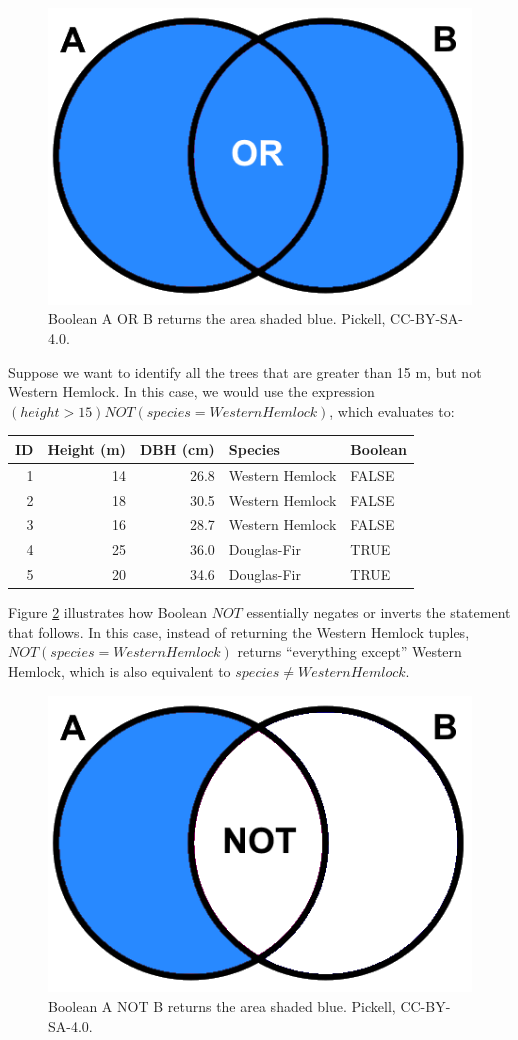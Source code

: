 \documentclass[
]{book}
\begin{document}
\begin{figure}
\includegraphics[width=0.75\linewidth]{images/05-boolean-or} \caption{Boolean A OR B returns the area shaded blue. Pickell, CC-BY-SA-4.0.}\label{fig:5-boolean-or}
\end{figure}

Suppose we want to identify all the trees that are greater than 15 m, but not Western Hemlock. In this case, we would use the expression \((height>15)NOT(species=WesternHemlock)\), which evaluates to:

\begin{tabular}{rrrll}
\toprule
ID & Height (m) & DBH (cm) & Species & Boolean\\
\midrule
1 & 14 & 26.8 & Western Hemlock & FALSE\\
2 & 18 & 30.5 & Western Hemlock & FALSE\\
3 & 16 & 28.7 & Western Hemlock & FALSE\\
4 & 25 & 36.0 & Douglas-Fir & TRUE\\
5 & 20 & 34.6 & Douglas-Fir & TRUE\\
\bottomrule
\end{tabular}

Figure \ref{fig:5-boolean-not} illustrates how Boolean \(NOT\) essentially negates or inverts the statement that follows. In this case, instead of returning the Western Hemlock tuples, \(NOT(species=WesternHemlock)\) returns ``everything except'' Western Hemlock, which is also equivalent to \(species≠WesternHemlock\).

\begin{figure}
\includegraphics[width=0.75\linewidth]{images/05-boolean-not} \caption{Boolean A NOT B returns the area shaded blue. Pickell, CC-BY-SA-4.0.}\label{fig:5-boolean-not}
\end{figure}
\end{document}
